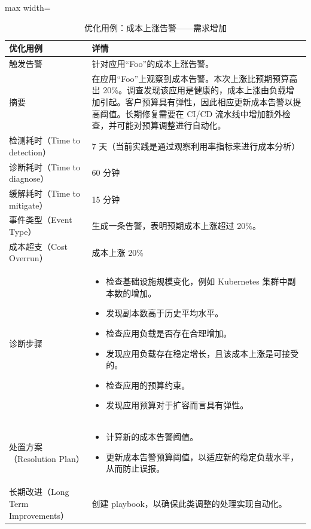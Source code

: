 \begin{table}[H]
\centering
\caption{优化用例：成本上涨告警——需求增加}
\label{tab:e25}
\begin{adjustbox}{max width=\linewidth}
\begin{tabular}{@{}p{3.2cm}p{11cm}@{}}
\toprule
\textbf{优化用例} & \textbf{详情} \\
\midrule
触发告警 & 针对应用“Foo”的成本上涨告警。 \\
\addlinespace
摘要 & 在应用“Foo”上观察到成本告警。本次上涨比预期预算高出 20\%。调查发现该应用是健康的，成本上涨由负载增加引起。客户预算具有弹性，因此相应更新成本告警以提高阈值。长期修复需要在 CI/CD 流水线中增加额外检查，并可能对预算调整进行自动化。 \\
\addlinespace
检测耗时（Time to detection） & 7 天（当前实践是通过观察利用率指标来进行成本分析） \\
诊断耗时（Time to diagnose） & 60 分钟 \\
缓解耗时（Time to mitigate） & 15 分钟 \\
事件类型（Event Type） & 生成一条告警，表明预期成本上涨超过 20\%。 \\
成本超支（Cost Overrun） & 成本上涨 20\% \\
\addlinespace
诊断步骤 &
\begin{itemize}[leftmargin=*,nosep]
\item 检查基础设施规模变化，例如 Kubernetes 集群中副本数的增加。
\item 发现副本数高于历史平均水平。
\item 检查应用负载是否存在合理增加。
\item 发现应用负载存在稳定增长，且该成本上涨是可接受的。
\item 检查应用的预算约束。
\item 发现应用预算对于扩容而言具有弹性。
\end{itemize} \\
\addlinespace
处置方案（Resolution Plan） &
\begin{itemize}[leftmargin=*,nosep]
\item 计算新的成本告警阈值。
\item 更新成本告警预算阈值，以适应新的稳定负载水平，从而防止误报。
\end{itemize} \\
\addlinespace
长期改进（Long Term Improvements） & 创建 playbook，以确保此类调整的处理实现自动化。 \\
\bottomrule
\end{tabular}
\end{adjustbox}
\end{table}

